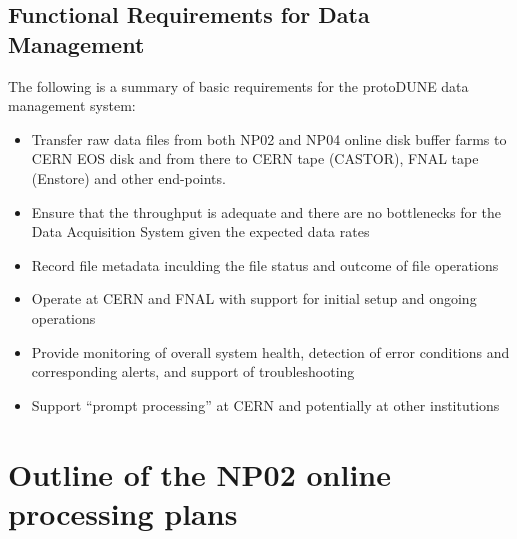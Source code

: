 \documentclass[12pt]{article}
\newcommand{\pd}{protoDUNE\xspace}
\begin{document}
{\subsection{Functional Requirements for Data Management}
\label{sec:func_reqs}
The following is a summary of basic requirements for the \pd data management system:
\begin{itemize}

\item Transfer raw data files from both NP02 and NP04 online disk buffer farms
to CERN EOS disk and from there to CERN tape (CASTOR), FNAL tape (Enstore) and other end-points.

\item Ensure that the throughput is adequate and there are no bottlenecks for the Data Acquisition System
given the expected data rates

\item Record file metadata inculding the file status and outcome of file operations

\item Operate at CERN and FNAL with support for initial setup and ongoing operations

\item Provide monitoring of overall system health, detection of error conditions and corresponding alerts, and support of troubleshooting



\item Support ``prompt processing'' at CERN and potentially at other institutions

\end{itemize}



\section{Outline of the NP02 online processing plans}

\label{sec:np02_online_processing}

}
\end{document}
